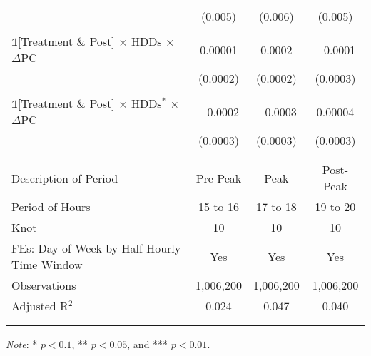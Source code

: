{\begin{table}[t!]
\begin{adjustbox}{scale = 1.0}
\begin{threeparttable}
\begin{tabular}{@{\extracolsep{40pt}}lccc}
                    & (0.005) & (0.006) & (0.005) \\
                    & & & \\
                    $\mathbb{1}$[Treatment \& Post] $\times$ HDDs $\times$ $\Delta$PC & 0.00001 & 0.0002 & $-$0.0001 \\
                    & (0.0002) & (0.0002) & (0.0003) \\
                    & & & \\
                    $\mathbb{1}$[Treatment \& Post] $\times$ HDDs$^{*}$ $\times$ $\Delta$PC & $-$0.0002 & $-$0.0003 & 0.00004 \\
                    & (0.0003) & (0.0003) & (0.0003) \\
                    & & & \\
                    \hline
                    \\[-2.0ex]
                    Description of Period & Pre-Peak & Peak & Post-Peak \\
                    Period of Hours & 15 to 16 & 17 to 18 & 19 to 20 \\
                    Knot & 10 & 10 & 10 \\
                    FEs: Day of Week by Half-Hourly Time Window & Yes & Yes & Yes \\
                    Observations & 1,006,200 & 1,006,200 & 1,006,200 \\
                    Adjusted R$^{2}$ & 0.024 & 0.047 & 0.040 \\
                    \\[-2.0ex]
                    \hline \hline
                    \\[-4.5ex]
                \end{tabular}
                \begin{tablenotes}[flushleft]
                    \footnotesize
                    \item \textit{Note}: * $p < 0.1$, ** $p < 0.05$, and *** $p < 0.01$.
                \end{tablenotes}
            \end{threeparttable}
        \end{adjustbox}
    \end{table}
}
